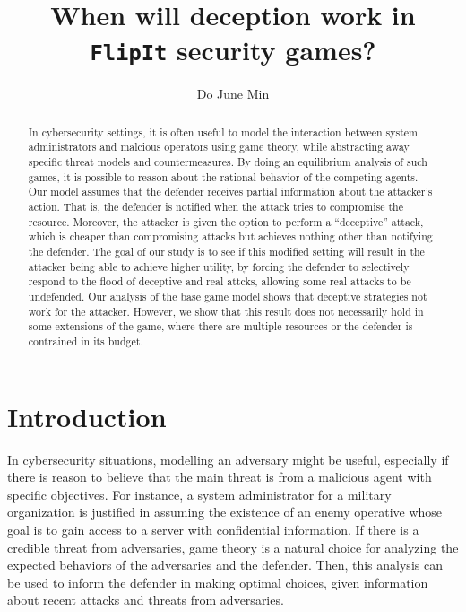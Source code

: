 \documentclass[11pt]{article}
\title{When will deception work in \texttt{FlipIt} security games?}
\author{Do June Min}
\theoremstyle{plain}
\begin{document}
\maketitle

\begin{abstract}
    In cybersecurity settings, it is often useful to model the interaction between system administrators and malcious operators using game theory, while abstracting away specific threat models and countermeasures. 
    By doing an equilibrium analysis of such games, it is possible to reason about the rational behavior of the competing agents.  
    Our model assumes that the defender receives partial information about the attacker's action. That is, the defender is notified when the attack tries to compromise the resource. Moreover, the attacker is given the option to perform a ``deceptive'' attack, which is cheaper than compromising attacks but achieves nothing other than notifying the defender. The goal of our study is to see if this modified setting will result in the attacker being able to achieve higher utility, by forcing the defender to selectively respond to the flood of deceptive and real attcks, allowing some real attacks to be undefended. Our analysis of the base game model shows that deceptive strategies not work for the attacker. However, we show that this result does not necessarily hold in some extensions of the game, where there are multiple resources or the defender is contrained in its budget.
\end{abstract}



\section{Introduction}



In cybersecurity situations, modelling an adversary might be useful, especially if there is reason to believe that the main threat is from a malicious agent with specific objectives. For instance, a system administrator for a military organization is justified in assuming the existence of an enemy operative whose goal is to gain access to a server with confidential information. If there is a credible threat from adversaries, game theory is a natural choice for analyzing the expected behaviors of the adversaries and the defender\cite{Shiva1}. Then, this analysis can be used to inform the defender in making optimal choices, given information about recent attacks and threats from adversaries.
\end{document}

